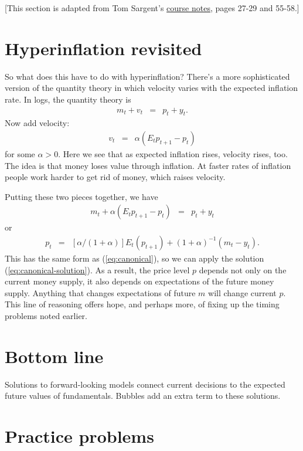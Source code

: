 \documentclass[11pt]{article}
\begin{document}
[This section is adapted from Tom Sargent's
\href{https://files.nyu.edu/ts43/public/teaching/NYU_course_all_2011.pdf}{course notes},
pages 27-29 and 55-58.]


\section{Hyperinflation revisited}

So what does this have to do with hyperinflation?
There's a more sophisticated version of the quantity theory in which
velocity varies with the expected inflation rate.
In logs, the quantity theory is
\begin{eqnarray*}
    m_t + v_t &=& p_t + y_t .
\end{eqnarray*}
Now add velocity:
\begin{eqnarray*}
    v_t &=& \alpha (E_t p_{t+1} - p_t )
\end{eqnarray*}
for some $\alpha > 0$.
Here we see that as expected inflation rises,
velocity rises, too.
The idea is that money loses value through inflation.
At faster rates of inflation people work harder to get rid of money,
which raises velocity.

Putting these two pieces together, we have
\begin{eqnarray*}
    m_t + \alpha (E_t p_{t+1} - p_t ) &=& p_t + y_t
\end{eqnarray*}
or
\begin{eqnarray*}
    p_t  &=& [\alpha/(1+\alpha)] E_t (p_{t+1})  + (1+\alpha)^{-1} (m_t- y_t).
\end{eqnarray*}
This has the same form as (\ref{eq:canonical}),
so we can apply the solution (\ref{eq:canonical-solution}).
As a result, the price level $p$ depends not only on the current money
supply, it also depends on expectations of the future money supply.
Anything that changes expectations of future $m$ will change current $p$.
This line of reasoning offers hope, and perhaps more,
of fixing up the timing problems noted earlier.



\section*{Bottom line}

Solutions to forward-looking models connect current decisions
to the expected future values of fundamentals.
Bubbles add an extra term to these solutions.


\section*{Practice problems}
\end{document}
